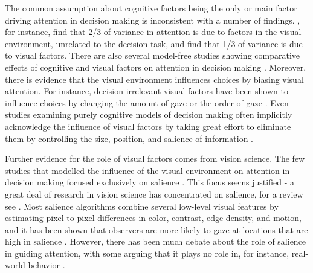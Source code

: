 The common assumption about cognitive factors being the only or main factor driving attention in decision making is inconsistent with a number of findings. \cite{vanderlans2008}, for instance, find that 2/3 of variance in attention is due to factors in the visual environment, unrelated to the decision task, and \cite{towal2013a} find that 1/3 of variance is due to visual factors. There are also several model-free studies showing comparative effects of cognitive and visual factors on attention in decision making \citep{gidloef2017a, orquin2015a, orquin2019a}. Moreover, there is evidence that the visual environment influences choices by biasing visual attention. For instance, decision irrelevant visual factors have been shown to influence choices by changing the amount of gaze \citep{peschel2019, chandon2009a} or the order of gaze \citep{reeck2017a}. Even studies examining purely cognitive models of decision making often implicitly acknowledge the influence of visual factors by taking great effort to eliminate them by controlling the size, position, and salience of information \citep{brandstatter2014, gloeckner2011a, perkovic2018}.

Further evidence for the role of visual factors comes from vision science. The few studies that modelled the influence of the visual environment on attention in decision making focused exclusively on salience \citep{chen2013,navalpakkam2010, towal2013a}. This focus seems justified - a great deal of research in vision science has concentrated on salience, for a review see \cite{borji2012a}. Most salience algorithms combine several low-level visual features by estimating pixel to pixel differences in color, contrast, edge density, and motion, and it has been shown that observers are more likely to gaze at locations that are high in salience \citep{itti2000}. However, there has been much debate about the role of salience in guiding attention, with some arguing that it plays no role in, for instance, real-world behavior \citep{tatler2011a}.

